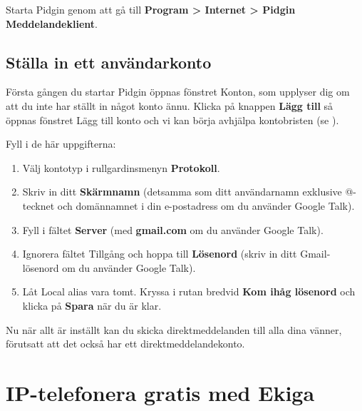 \documentclass[a4paper,final]{memoir} %
\begin{document}
Starta Pidgin genom att gå till \textbf{Program \textgreater{} Internet \textgreater{} Pidgin Meddelandeklient}. 

\subsection{Ställa in ett användarkonto}

Första gången du startar Pidgin öppnas fönstret Konton, som upplyser dig om att du inte har ställt in något konto ännu. Klicka på knappen \textbf{Lägg till} så öppnas fönstret Lägg till konto och vi kan börja avhjälpa kontobristen (se ).


Fyll i de här uppgifterna:

\begin{enumerate}
\item Välj kontotyp i rullgardinsmenyn \textbf{Protokoll}.
\item Skriv in ditt \textbf{Skärmnamn} (detsamma som ditt användarnamn exklusive @-tecknet och domännamnet i din e-postadress om du använder Google Talk).
\item Fyll i fältet \textbf{Server} (med \textbf{gmail.com} om du använder Google Talk).
\item Ignorera fältet Tillgång och hoppa till \textbf{Lösenord} (skriv in ditt Gmail-lösenord om du använder Google Talk).
\item Låt Local alias vara tomt. Kryssa i rutan bredvid \textbf{Kom ihåg lösenord} och klicka på \textbf{Spara} när du är klar.
\end{enumerate}

Nu när allt är inställt kan du skicka direktmeddelanden till alla dina vänner, förutsatt att det också har ett direktmeddelandekonto. 



\section{IP-telefonera gratis med Ekiga}
\end{document}
